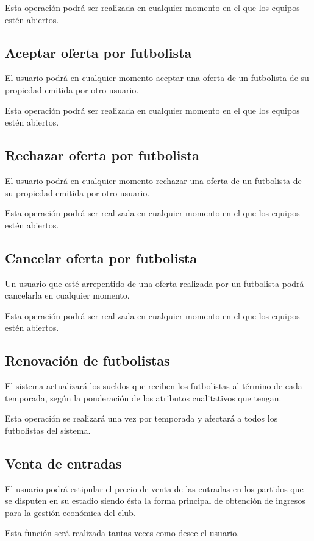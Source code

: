 Esta operación podrá ser realizada en cualquier momento en el que los equipos
estén abiertos.

\subsection{Aceptar oferta por futbolista}
El usuario podrá en cualquier momento aceptar una oferta de un futbolista de su
propiedad emitida por otro usuario.

Esta operación podrá ser realizada en cualquier momento en el que los equipos
estén abiertos.

\subsection{Rechazar oferta por futbolista}
El usuario podrá en cualquier momento rechazar una oferta de un futbolista de su
propiedad emitida por otro usuario.

Esta operación podrá ser realizada en cualquier momento en el que los equipos
estén abiertos.

\subsection{Cancelar oferta por futbolista}
Un usuario que esté arrepentido de una oferta realizada por un futbolista podrá
cancelarla en cualquier momento.

Esta operación podrá ser realizada en cualquier momento en el que los equipos
estén abiertos.

\subsection{Renovación de futbolistas}
El sistema actualizará los sueldos que reciben los futbolistas al término de
cada temporada, según la ponderación de los atributos cualitativos que tengan.

Esta operación se realizará una vez por temporada y afectará a todos los
futbolistas del sistema.
\subsection{Venta de entradas}
El usuario podrá estipular el precio de venta de las entradas en los partidos
que se disputen en su estadio siendo ésta la forma principal de obtención de
ingresos para la gestión económica del club.

Esta función será realizada tantas veces como desee el usuario.

